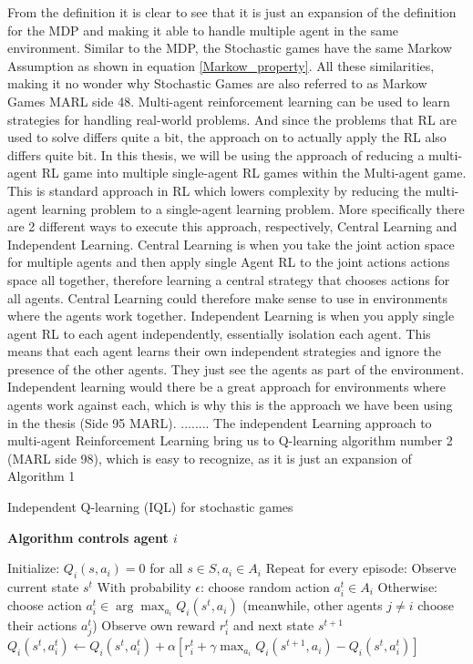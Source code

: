 \documentclass{article}
\begin{document}
From the definition it is clear to see that it is just an expansion of the definition for the MDP and making it able to handle multiple agent in the same environment. Similar to the MDP, the Stochastic games have the same Markow Assumption as shown in equation \ref{Markow_property}. All these similarities, making it no wonder why Stochastic Games are also referred to as Markow Games MARL side 48.
\newline 
\newline
Multi-agent reinforcement learning can be used to learn strategies for handling real-world problems. And since the problems that RL are used to solve differs quite a bit, the approach on to actually apply the RL also differs quite bit. In this thesis, we will be using the approach of reducing 
a multi-agent RL game into multiple single-agent RL games within the Multi-agent game. This is standard approach in RL which lowers complexity by reducing the multi-agent learning problem to a single-agent learning problem. More specifically there are 2 different ways to execute this approach, respectively, Central Learning and Independent Learning. Central Learning is when you take the joint action space for multiple agents and then apply single Agent RL to the joint actions actions space all together, therefore learning a central strategy that chooses actions for all agents. Central Learning could therefore make sense to use in environments where the agents work together. Independent Learning is when you apply single agent RL to each agent independently, essentially isolation each agent. This means that each agent learns their own independent strategies and ignore the presence of the other agents. They just see the agents as part of the environment. Independent learning would there be a great approach for environments where agents work against each, which is why this is the approach we have been using in the thesis (Side 95 MARL). 
\newline
\newline
........ The independent Learning approach to multi-agent Reinforcement Learning bring us to Q-learning algorithm number 2 (MARL side 98), which is easy to recognize, as it is just an expansion of Algorithm 1  
\newline
\newline 
\begin{algorithm}
\caption{Independent Q-learning (IQL) for stochastic games}
\textbf{Algorithm controls agent \(i\)}
\begin{algorithmic}[1]
\State Initialize: \( Q_i(s, a_i) = 0 \) for all \( s \in S, a_i \in A_i \)
\State Repeat for every episode:
    \State Observe current state \( s^t \)
    \State With probability \( \epsilon \): choose random action \( a_i^t \in A_i \)
    \State Otherwise: choose action \( a_i^t \in \arg \max_{a_i} Q_i(s^t, a_i) \)
    \State (meanwhile, other agents \( j \neq i \) choose their actions \( a_j^t \))
    \State Observe own reward \( r_i^t \) and next state \( s^{t+1} \)
    \State \( Q_i(s^t, a_i^t) \gets Q_i(s^t, a_i^t) + \alpha [r_i^t + \gamma \max_{a_i} Q_i(s^{t+1}, a_i) - Q_i(s^t, a_i^t)] \)
\EndFor
\end{algorithmic}
\end{algorithm}
\end{document}
